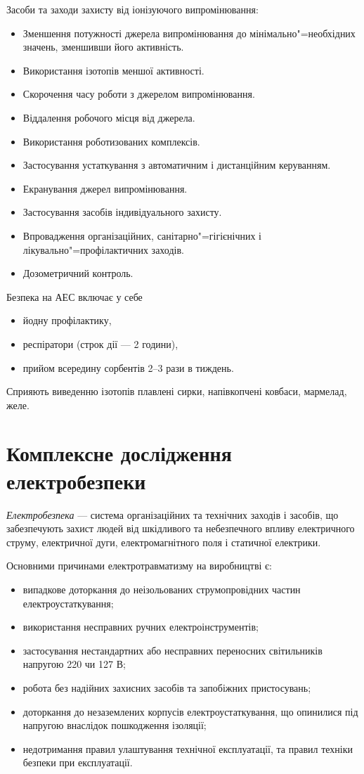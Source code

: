 \documentclass[a4paper,10pt,notitlepage,pdftex,headsepline]{scrartcl}
\begin{document}
  Засоби та заходи захисту від іонізуючого випромінювання:
  \begin{itemize}
    \item Зменшення потужності джерела випромінювання до
      мінімально"=необхідних значень, зменшивши його активність.
    \item Використання ізотопів меншої активності.
    \item Скорочення часу роботи з джерелом випромінювання.
    \item Віддалення робочого місця від джерела.
    \item Використання роботизованих комплексів.
    \item Застосування устаткування з автоматичним і дистанційним керуванням.
    \item Екранування джерел випромінювання.
    \item Застосування засобів індивідуального захисту.
    \item Впровадження організаційних, санітарно"=гігієнічних і
      лікувально"=профілактичних заходів.
    \item Дозометричний контроль.
  \end{itemize}

  Безпека на АЕС включає у себе
  \begin{itemize}
    \item йодну профілактику,
    \item респіратори (строк дії --- 2 години),
    \item прийом всередину сорбентів 2--3 рази в тиждень.
  \end{itemize}

  Сприяють виведенню ізотопів плавлені сирки, напівкопчені ковбаси, мармелад,
  желе.
\section{Комплексне дослідження електробезпеки}
  \emph{Електробезпека} --- система організаційних та технічних заходів і
  засобів, що забезпечують захист людей від шкідливого та небезпечного впливу
  електричного струму, електричної дуги, електромагнітного поля і статичної
  електрики.

  Основними причинами електротравматизму на виробництві є:
  \begin{itemize}
    \item випадкове доторкання до неізольованих струмопровідних частин
      електроустаткування;
    \item використання несправних ручних електроінструментів;
    \item застосування нестандартних або несправних переносних світильників
      напругою 220 чи 127 В;
    \item робота без надійних захисних засобів та запобіжних пристосувань;
    \item доторкання до незаземлених корпусів електроустаткування, що
      опинилися під напругою внаслідок пошкодження ізоляції;
    \item недотримання правил улаштування технічної експлуатації, та правил
    техніки безпеки при експлуатації.
  \end{itemize}
\end{document}
